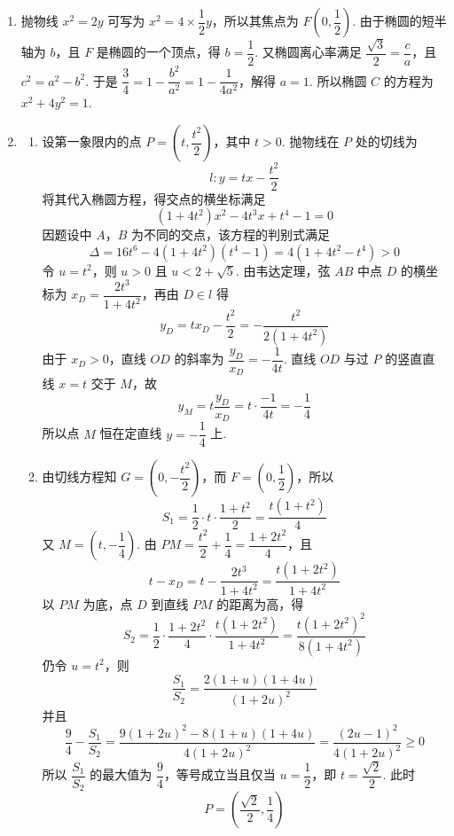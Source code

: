 \begin{solution}
\begin{enumerate}
\item 抛物线 \(x^2=2y\) 可写为 \(x^2=4\times\dfrac12y\)，所以其焦点为 \(F\left(0,\dfrac12\right)\). 由于椭圆的短半轴为 \(b\)，且 \(F\) 是椭圆的一个顶点，得 \(b=\dfrac12\).
又椭圆离心率满足 \(\dfrac{\sqrt3}{2}=\dfrac ca\)，且 \(c^2=a^2-b^2\).
于是 \(\dfrac34=1-\dfrac{b^2}{a^2}=1-\dfrac1{4a^2}\)，解得 \(a=1\). 所以椭圆 \(C\) 的方程为 \(x^2+4y^2=1\).
\item
\begin{enumerate}
\item 设第一象限内的点 \(P=(t,\dfrac{t^2}{2})\)，其中 \(t>0\). 抛物线在 \(P\) 处的切线为
\[
l\colon y=t x-\frac{t^2}{2}
\]
将其代入椭圆方程，得交点的横坐标满足
\[
(1+4t^2)x^2-4t^3x+t^4-1=0
\]
因题设中 \(A\)，\(B\) 为不同的交点，该方程的判别式满足
\[
\Delta=16t^6-4(1+4t^2)(t^4-1)=4(1+4t^2-t^4)>0
\]
令 \(u=t^2\)，则 \(u>0\) 且 \(u<2+\sqrt5\). 由韦达定理，弦 \(AB\) 中点 \(D\) 的横坐标为 \(x_D=\dfrac{2t^3}{1+4t^2}\)，再由 \(D\in l\) 得
\[
y_D=tx_D-\frac{t^2}{2}=-\frac{t^2}{2(1+4t^2)}
\]
由于 \(x_D>0\)，直线 \(OD\) 的斜率为 \(\dfrac{y_D}{x_D}=-\dfrac1{4t}\). 直线 \(OD\) 与过 \(P\) 的竖直直线 \(x=t\) 交于 \(M\)，故
\[
y_M=t\frac{y_D}{x_D}=t\cdot\frac{-1}{4t}=-\frac14
\]
所以点 \(M\) 恒在定直线 \(y=-\dfrac14\) 上.
\item 由切线方程知 \(G=\left(0,-\dfrac{t^2}{2}\right)\)，而 \(F=\left(0,\dfrac12\right)\)，所以
\[
S_1=\frac12\cdot t\cdot\frac{1+t^2}{2}=\frac{t(1+t^2)}4
\]
又 \(M=(t,-\dfrac14)\).
由 \(PM=\dfrac{t^2}{2}+\dfrac14=\dfrac{1+2t^2}{4}\)，且
\[
t-x_D=t-\frac{2t^3}{1+4t^2}=\frac{t(1+2t^2)}{1+4t^2}
\]
以 \(PM\) 为底，点 \(D\) 到直线 \(PM\) 的距离为高，得
\[
S_2=\frac12\cdot\frac{1+2t^2}{4}\cdot\frac{t(1+2t^2)}{1+4t^2}=\frac{t(1+2t^2)^2}{8(1+4t^2)}
\]
仍令 \(u=t^2\)，则
\[
\frac{S_1}{S_2}=\frac{2(1+u)(1+4u)}{(1+2u)^2}
\]
并且
\[
\frac94-\frac{S_1}{S_2}=\frac{9(1+2u)^2-8(1+u)(1+4u)}{4(1+2u)^2}=\frac{(2u-1)^2}{4(1+2u)^2}\geq0
\]
所以 \(\dfrac{S_1}{S_2}\) 的最大值为 \(\dfrac94\)，等号成立当且仅当 \(u=\dfrac12\)，即 \(t=\dfrac{\sqrt2}{2}\). 此时
\[
P=\left(\frac{\sqrt2}{2},\frac14\right)
\]
\end{enumerate}
\end{enumerate}
\end{solution}

